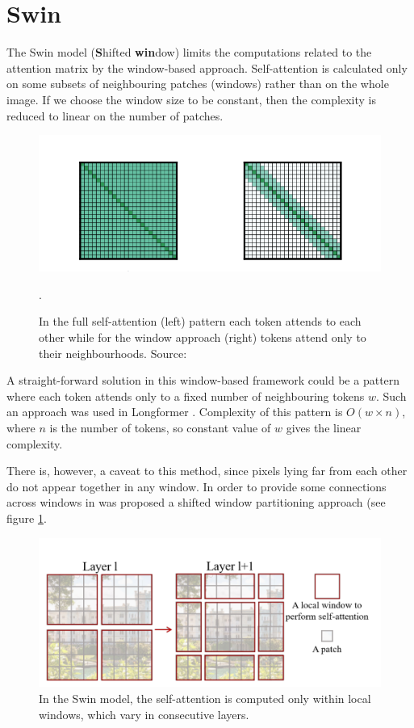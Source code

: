 \documentclass[magisterska,en]{pracamgr}
\begin{document}
\section{Swin}\label{r:swin}
The Swin model (\textbf{S}hifted \textbf{win}dow) \cite{DBLP:conf/iccv/LiuL00W0LG21} limits the computations related to the attention matrix by the window-based approach. Self-attention is calculated only on some subsets of neighbouring patches (windows) rather than on the whole image. If we choose the window size to be constant, then the complexity is reduced to linear on the number of patches.
\begin{figure}[H]
\centering
\includegraphics[scale=0.4]{./images/sliding_window.png}
\caption{In the full self-attention (left) pattern each token attends to each other while for the window approach (right) tokens attend only to their neighbourhoods. Source: \cite{DBLP:journals/corr/abs-2004-05150}}.
\end{figure}


A straight-forward solution in this window-based framework could be a pattern where each token attends only to a fixed number of neighbouring tokens $w$. Such an approach was used in Longformer \cite{DBLP:journals/corr/abs-2004-05150}. Complexity of this pattern is $O(w \times n)$, where $n$ is the number of tokens, so constant 
value of $w$ gives the linear complexity. 

There is, however, a caveat to this method, since pixels lying far from each other do not appear together in any window. In order to provide some connections across windows in \cite{DBLP:conf/iccv/LiuL00W0LG21} was proposed a shifted window partitioning approach (see figure \ref{changing_windows}. 


\begin{figure}[H]
\centering
\includegraphics[scale=0.6]{./images/changing_windows.png}
\caption{In the Swin model, the self-attention is computed only within local windows, which vary in consecutive layers.}
\label{changing_windows}
\end{figure}
\end{document}
